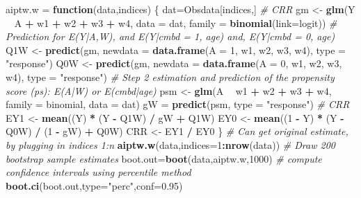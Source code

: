 \documentclass[
]{article}
\newenvironment{Shaded}{\begin{snugshade}}{\end{snugshade}}
\newcommand{\CommentTok}[1]{\textcolor[rgb]{0.56,0.35,0.01}{\textit{#1}}}
\newcommand{\ControlFlowTok}[1]{\textcolor[rgb]{0.13,0.29,0.53}{\textbf{#1}}}
\newcommand{\DataTypeTok}[1]{\textcolor[rgb]{0.13,0.29,0.53}{#1}}
\newcommand{\DecValTok}[1]{\textcolor[rgb]{0.00,0.00,0.81}{#1}}
\newcommand{\FloatTok}[1]{\textcolor[rgb]{0.00,0.00,0.81}{#1}}
\newcommand{\KeywordTok}[1]{\textcolor[rgb]{0.13,0.29,0.53}{\textbf{#1}}}
\newcommand{\NormalTok}[1]{#1}
\newcommand{\OperatorTok}[1]{\textcolor[rgb]{0.81,0.36,0.00}{\textbf{#1}}}
\newcommand{\StringTok}[1]{\textcolor[rgb]{0.31,0.60,0.02}{#1}}
\begin{document}
\begin{Shaded}
\begin{Highlighting}[]
\NormalTok{aiptw.w =}\StringTok{ }\ControlFlowTok{function}\NormalTok{(data,indices)}
\NormalTok{\{}
\NormalTok{    dat=Obsdata[indices,]}
    \CommentTok{# CRR}
\NormalTok{    gm <-}\StringTok{ }\KeywordTok{glm}\NormalTok{(Y }\OperatorTok{~}\StringTok{ }\NormalTok{A }\OperatorTok{+}\StringTok{ }\NormalTok{w1 }\OperatorTok{+}\StringTok{ }\NormalTok{w2 }\OperatorTok{+}\StringTok{ }\NormalTok{w3 }\OperatorTok{+}\StringTok{ }\NormalTok{w4, }\DataTypeTok{data =}\NormalTok{ dat, }\DataTypeTok{family =} \KeywordTok{binomial}\NormalTok{(}\DataTypeTok{link=}\NormalTok{logit))}
    \CommentTok{# Prediction for E(Y|A,W), and E(Y|cmbd = 1, age) and, E(Y|cmbd = 0, age)}
\NormalTok{    Q1W <-}\StringTok{ }\KeywordTok{predict}\NormalTok{(gm, }\DataTypeTok{newdata =} \KeywordTok{data.frame}\NormalTok{(}\DataTypeTok{A =} \DecValTok{1}\NormalTok{, w1, w2, w3, w4), }\DataTypeTok{type =} \StringTok{"response"}\NormalTok{)}
\NormalTok{    Q0W <-}\StringTok{ }\KeywordTok{predict}\NormalTok{(gm, }\DataTypeTok{newdata =} \KeywordTok{data.frame}\NormalTok{(}\DataTypeTok{A =} \DecValTok{0}\NormalTok{, w1, w2, w3, w4), }\DataTypeTok{type =} \StringTok{"response"}\NormalTok{)}
    \CommentTok{# Step 2 estimation and prediction of the propensity score (ps): E(A|W) or E(cmbd|age)}
\NormalTok{    psm <-}\StringTok{ }\KeywordTok{glm}\NormalTok{(A }\OperatorTok{~}\StringTok{ }\NormalTok{w1 }\OperatorTok{+}\StringTok{ }\NormalTok{w2 }\OperatorTok{+}\StringTok{ }\NormalTok{w3 }\OperatorTok{+}\StringTok{ }\NormalTok{w4, }\DataTypeTok{family =}\NormalTok{ binomial, }\DataTypeTok{data =}\NormalTok{ dat)}
\NormalTok{    gW =}\StringTok{ }\KeywordTok{predict}\NormalTok{(psm, }\DataTypeTok{type =} \StringTok{"response"}\NormalTok{)}
    \CommentTok{# CRR}
\NormalTok{    EY1 <-}\StringTok{ }\KeywordTok{mean}\NormalTok{((Y) }\OperatorTok{*}\StringTok{ }\NormalTok{(Y }\OperatorTok{-}\StringTok{ }\NormalTok{Q1W) }\OperatorTok{/}\StringTok{ }\NormalTok{gW }\OperatorTok{+}\StringTok{ }\NormalTok{Q1W)}
\NormalTok{    EY0 <-}\StringTok{ }\KeywordTok{mean}\NormalTok{((}\DecValTok{1} \OperatorTok{-}\StringTok{ }\NormalTok{Y) }\OperatorTok{*}\StringTok{ }\NormalTok{(Y }\OperatorTok{-}\StringTok{ }\NormalTok{Q0W) }\OperatorTok{/}\StringTok{ }\NormalTok{(}\DecValTok{1} \OperatorTok{-}\StringTok{ }\NormalTok{gW) }\OperatorTok{+}\StringTok{ }\NormalTok{Q0W)}
\NormalTok{    CRR <-}\StringTok{ }\NormalTok{EY1 }\OperatorTok{/}\StringTok{ }\NormalTok{EY0}
\NormalTok{\}}
\CommentTok{# Can get original estimate, by plugging in indices 1:n}
\KeywordTok{aiptw.w}\NormalTok{(data,}\DataTypeTok{indices=}\DecValTok{1}\OperatorTok{:}\KeywordTok{nrow}\NormalTok{(data))}
\CommentTok{# Draw 200 bootstrap sample estimates }
\NormalTok{boot.out=}\KeywordTok{boot}\NormalTok{(data,aiptw.w,}\DecValTok{1000}\NormalTok{)}
\CommentTok{# compute confidence intervals using percentile method}
\KeywordTok{boot.ci}\NormalTok{(boot.out,}\DataTypeTok{type=}\StringTok{"perc"}\NormalTok{,}\DataTypeTok{conf=}\FloatTok{0.95}\NormalTok{)}
\end{Highlighting}
\end{Shaded}
\end{document}
